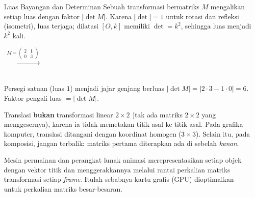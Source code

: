 \documentclass[11pt,a4paper]{report}
\theoremstyle{gaya}
\begin{document}
\begin{konsep}{Luas Bayangan dan Determinan}
Sebuah transformasi bermatriks $M$ mengalikan setiap luas dengan faktor $|\det M|$. Karena $|\det|=1$ untuk rotasi dan refleksi (isometri), luas terjaga; dilatasi $[O,k]$ memiliki $\det=k^2$, sehingga luas menjadi $k^2$ kali.
\end{konsep}

\begin{center}
\quad $\xrightarrow{\ M=\left(\begin{smallmatrix}2&1\\0&3\end{smallmatrix}\right)\ }$ \quad
{}\\
\small Persegi satuan (luas $1$) menjadi jajar genjang berluas $|\det M|=|2\cdot3-1\cdot0|=6$. Faktor pengali luas $=|\det M|$.
\end{center}

\begin{kesalahan}
Translasi \textbf{bukan} transformasi linear $2\times2$ (tak ada matriks $2\times2$ yang menggesernya), karena ia tidak memetakan titik asal ke titik asal. Pada grafika komputer, translasi ditangani dengan koordinat homogen ($3\times3$). Selain itu, pada komposisi, jangan terbalik: matriks pertama diterapkan ada di sebelah \emph{kanan}.
\end{kesalahan}

\begin{dunianyata}
Mesin permainan dan perangkat lunak animasi merepresentasikan setiap objek dengan vektor titik dan menggerakkannya melalui rantai perkalian matriks transformasi setiap \emph{frame}. Itulah sebabnya kartu grafis (GPU) dioptimalkan untuk perkalian matriks besar-besaran.
\end{dunianyata}
\end{document}
